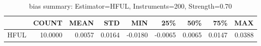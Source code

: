 \begin{table}[ht]
\centering
\caption{bias summary: Estimator=HFUL, Instruments=200, Strength=0.70}
\begin{tabular}{lrrrrrrrr}
\toprule
 & COUNT & MEAN & STD & MIN & 25\% & 50\% & 75\% & MAX \\
\midrule
HFUL & 10.0000 & 0.0057 & 0.0164 & -0.0180 & -0.0065 & 0.0065 & 0.0147 & 0.0388 \\
\bottomrule
\end{tabular}
\end{table}
